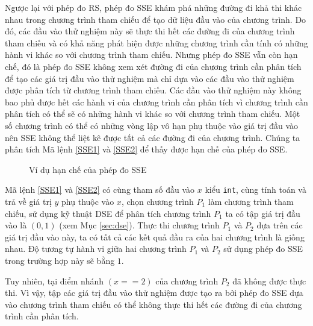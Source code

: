 Ngược lại với phép đo RS, phép đo SSE khám phá những đường đi khả thi
khác nhau trong chương trình tham chiếu để tạo dữ liệu đầu vào của
chương trình. Do đó, các đầu vào thử nghiệm này sẽ thực thi hết các
đường đi của chương trình tham chiếu và có khả năng phát hiện được
những chương trình cần tính có những hành vi khác so với chương trình
tham chiếu. Nhưng phép đo SSE vẫn còn hạn chế, đó là phép đo SSE không
xem xét đường đi của chương trình cần phân tích để tạo các giá trị đầu
vào thử nghiệm mà chỉ dựa vào các đầu vào thử nghiệm được phân tích từ
chương trình tham chiếu. Các đầu vào thử nghiệm này không bao phủ được
hết các hành vi của chương trình cần phân tích vì chương trình cần
phân tích có thể sẽ có những hành vi khác so với chương trình tham
chiếu. Một số chương trình có thể có những vòng lập vô hạn phụ thuộc
vào giá trị đầu vào nên SSE không thể liệt kê được tất cả các đường
đi của chương trình. Chúng ta phân tích Mã lệnh
\ref{SSE1} và \ref{SSE2} để thấy được hạn chế của phép đo SSE.
\begin{figure}[h]
	\centering
	\caption{Ví dụ hạn chế của phép đo SSE}
	\label{fig:hanche-SSE}
\begin{minipage}[t]{0.45\linewidth}
  
\end{minipage}%
\hfill\vrule\hfill
\begin{minipage}[t]{0.45\linewidth}
	
\end{minipage}%
\end{figure}

Mã lệnh \ref{SSE1} và \ref{SSE2} có cùng tham số đầu vào $ x $ kiểu 
\texttt{int}, cùng tính toán và trả về giá trị $ y $ phụ thuộc vào $ x $, 
chọn chương trình $P_{1}$ làm chương trình tham chiếu, sử dụng kỹ 
thuật DSE để phân tích chương trình $P_{1}$ ta có tập giá trị đầu vào 
là $(0, 1)$ (xem Mục \ref{sec:dse}). Thực thi chương trình $P_{1}$ và 
$P_{2}$ dựa trên các giá trị đầu vào này, ta có tất cả các kết quả 
đầu ra của hai chương trình là giống nhau. Độ tương tự hành vi 
giữa hai chương trình $P_{1}$ và $P_{2}$ sử dụng phép đo SSE trong trường hợp này sẽ bằng $ 1 $.

Tuy nhiên, tại điểm nhánh $ (x == 2) $ của chương trình $ P_{2} $ 
đã không được thực thi. Vì vậy, tập các giá trị đầu vào thử nghiệm được tạo 
ra bởi phép đo SSE dựa vào chương trình tham chiếu có thể không 
thực thi hết các đường đi của chương trình cần phân tích.

